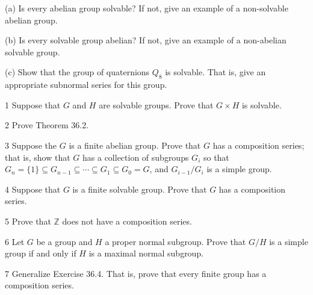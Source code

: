 \begin{problem}[Warmup]{(a)}
    Is every abelian group solvable? If not, give an example of a non-solvable abelian group.
\end{problem}
\unsolved

\begin{problem}[Warmup]{(b)}
    Is every solvable group abelian? If not, give an example of a non-abelian solvable group.
\end{problem}
\unsolved

\begin{problem}[Warmup]{(c)}
    Show that the group of quaternions $Q_8$ is solvable. That is, give an appropriate subnormal series for this group.
\end{problem}
\unsolved

\begin{problem}{1}
    Suppose that $G$ and $H$ are solvable groups. Prove that $G \times H$ is solvable.
\end{problem}
\unsolved

\begin{problem}{2}
    Prove Theorem 36.2.
\end{problem}
\unsolved

\begin{problem}{3}
    Suppose the $G$ is a finite abelian group. Prove that $G$ has a composition series;
    that is, show that $G$ has a collection of subgroups $G_i$ so that
    $G_n = \{1\} \subseteq G_{n - 1} \subseteq \cdots \subseteq G_1 \subseteq G_0 = G$, and
    $G_{i - 1}/G_i$ is a simple group.
\end{problem}
\unsolved

\begin{problem}{4}
    Suppose that $G$ is a finite solvable group. Prove that $G$ has a composition series.
\end{problem}
\unsolved

\begin{problem}{5}
    Prove that $\mathbb{Z}$ does not have a composition series.
\end{problem}
\unsolved

\begin{problem}{6}
    Let $G$ be a group and $H$ a proper normal subgroup. Prove that $G/H$ is a simple group
    if and only if $H$ is a maximal normal subgroup.
\end{problem}
\unsolved

\begin{problem}{7}
    Generalize Exercise 36.4. That is, prove that every finite group has a composition
    series.
\end{problem}
\unsolved
